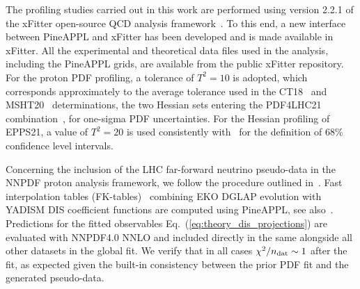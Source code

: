 The profiling studies carried out in this work are performed using version 2.2.1
of the 
{\sc\small xFitter} open-source QCD analysis framework~\cite{Alekhin:2014irh, Bertone:2017tig, xFitter:2022zjb, xFitter:web}.
%
To this end, a new interface between  {\sc\small PineAPPL} and {\sc\small xFitter} has been developed and is made available in {\sc\small xFitter}.
%
All the experimental and theoretical data files used in the analysis, including
the  {\sc\small PineAPPL}  grids, are available
from the public {\sc\small xFitter} repository.
%
For the proton PDF profiling, a tolerance of $T^2 = 10$ is adopted,
which  corresponds approximately to the average tolerance
used in the CT18~\cite{Hou:2019efy} and MSHT20~\cite{Bailey:2020ooq} determinations,
the two Hessian sets entering the PDF4LHC21 combination~\cite{PDF4LHCWorkingGroup:2022cjn}, for
one-sigma PDF uncertainties.
%
For the Hessian profiling of EPPS21, a value of $T^2 = 20$ is used consistently with~\cite{Eskola:2021nhw}
for the definition of 68\%  confidence level intervals.

Concerning the inclusion of the LHC far-forward neutrino pseudo-data
in the NNPDF proton analysis framework, we follow the procedure
outlined in~\cite{NNPDF:2021uiq}.
%
Fast interpolation tables (FK-tables)~\cite{Ball:2010de} combining {\sc\small EKO}
DGLAP evolution with {\sc\small YADISM} DIS coefficient functions
are computed using {\sc\small PineAPPL}, see also~\cite{Barontini:2023vmr}.
%
Predictions for the fitted observables Eq.~(\ref{eq:theory_dis_projections}) are evaluated
with NNPDF4.0 NNLO and included
directly in the same alongside all other datasets in the global fit.
%
We verify that in all cases $\chi^2/n_{\rm dat}\sim 1$ after the fit,
as expected given the built-in consistency between the prior PDF fit
and the generated pseudo-data.




